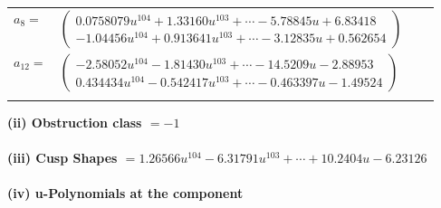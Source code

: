 \documentclass[1p]{elsarticle_modified}
\theoremstyle{definition}
\begin{document}
\begin{tabular}{m{7pt} m{180pt} m{7pt} m{180pt} }
\flushright $a_{8}=$&$\begin{pmatrix}0.0758079 u^{104}+1.33160 u^{103}+\cdots-5.78845 u+6.83418\\-1.04456 u^{104}+0.913641 u^{103}+\cdots-3.12835 u+0.562654\end{pmatrix}$ \\
\flushright $a_{12}=$&$\begin{pmatrix}-2.58052 u^{104}-1.81430 u^{103}+\cdots-14.5209 u-2.88953\\0.434434 u^{104}-0.542417 u^{103}+\cdots-0.463397 u-1.49524\end{pmatrix}$\\&\end{tabular}
\flushleft \textbf{(ii) Obstruction class $= -1$}\\~\\
\flushleft \textbf{(iii) Cusp Shapes $= 1.26566 u^{104}-6.31791 u^{103}+\cdots+10.2404 u-6.23126$}\\~\\
\newpage\renewcommand{\arraystretch}{1}
\flushleft \textbf{(iv) u-Polynomials at the component}\newline \\
\end{document}
